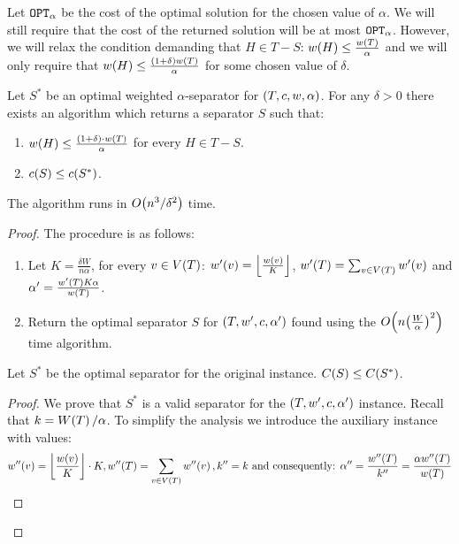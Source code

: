     Let $\texttt{OPT}_\alpha$ be the cost of the optimal solution for the chosen value of $\alpha$. We will still require that the cost of the returned solution will be at most $\texttt{OPT}_\alpha$. However, we will relax the condition demanding that $H\in T-S$: $w\mathopen{}\left( H \right)\leq \frac{w\mathopen{}\left( T \right)}{\alpha}$ and we will only require that $w\mathopen{}\left( H \right)\leq \frac{\mathopen{}\left( 1+\delta \right)w\mathopen{}\left( T \right)}{\alpha}$ for some chosen value of $\delta$. 
\begin{theorem}
    Let $S^*$ be an optimal weighted $\alpha$-separator for $\mathopen{}\left( T,c,w,\alpha \right)$. For any $\delta>0$ there exists an algorithm which returns a separator $S$ such that:
    \begin{enumerate}
        \item $w\mathopen{}\left( H \right)\leq \frac{\mathopen{}\left( 1+\delta \right)\cdot w\mathopen{}\left( T \right)}{\alpha}$ for every $H\in T-S$.
        \item $c\mathopen{}\left( S \right)\leq c\mathopen{}\left( S^* \right)$.
    \end{enumerate}
    The algorithm runs in $O\mathopen{}\left( n^3/\delta^2 \right)$ time.
    \begin{proof}
        The procedure is as follows:
        \begin{enumerate}
            \item Let $K=\frac{\delta W}{n\alpha}$, for every $v\in V\mathopen{}\left( T \right)$: $w'\mathopen{}\left( v \right) = \mathopen{}\left\lfloor \frac{w\mathopen{}\left( v \right)}{K} \right\rfloor$, $w'\mathopen{}\left( T \right)=\sum_{v\in V\mathopen{}\left( T \right)}w'\mathopen{}\left( v \right)$ and $\alpha'=\frac{w'\mathopen{}\left( T \right)K\alpha}{w\mathopen{}\left( T \right)}$.
            \item Return the optimal separator $S$ for $\mathopen{}\left( T, w', c, \alpha' \right)$ found using the $O\mathopen{}\left( n\mathopen{}\left( \frac{W}{\alpha} \right)^2 \right)$ time algorithm.
        \end{enumerate}
        \begin{lemma}
            Let $S^*$ be the optimal separator for the original instance. $C\mathopen{}\left( S \right)\leq C\mathopen{}\left( S^* \right)$.
            \begin{proof}
                We prove that $S^*$ is a valid separator for the $\mathopen{}\left( T, w', c, \alpha' \right)$ instance. 
                Recall that $k=W\mathopen{}\left( T \right)/\alpha$.
                To simplify the analysis we introduce the auxiliary instance with values: $$
                w''\mathopen{}\left( v \right) = \mathopen{}\left\lfloor \frac{w\mathopen{}\left( v \right)}{K} \right\rfloor\cdot K, 
                w''\mathopen{}\left( T \right)=\sum_{v\in V\mathopen{}\left( T \right)}w''\mathopen{}\left( v \right), k'' = k \text{ and consequently: } \alpha'' = \frac{w''\mathopen{}\left( T \right)}{k''}=\frac{\alpha w''\mathopen{}\left( T \right)}{w\mathopen{}\left( T \right)}$$
                

\end{proof}
\end{lemma}
\end{proof}
\end{theorem}
